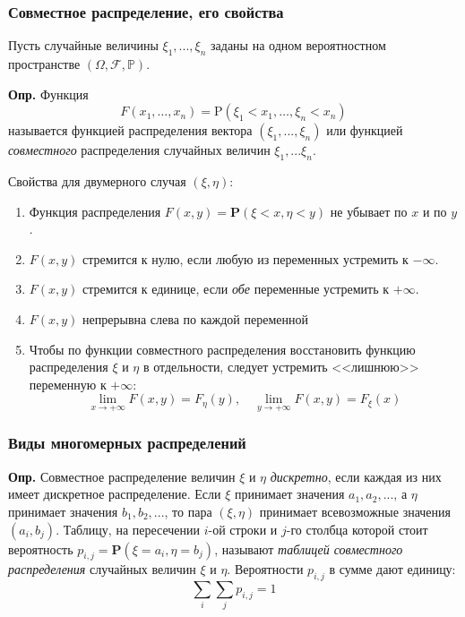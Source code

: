 \documentclass[oneside,final,14pt]{extreport}
\newcommand\mydef{{\bf Опр.}}
\newcommand\myprob[1]{{\mathbf{P}(#1)}}
\theoremstyle{definition}
\begin{document}
\subsubsection{Совместное распределение, его свойства}

Пусть случайные величины $\xi_1, ..., \xi_n$ заданы на одном вероятностном пространстве $(\Omega, \mathcal{F}, \mathbb{P})$.

\mydef{} Функция $$F\left(x_{1}, \ldots, x_{n}\right)=\mathrm{P}\left(\xi_{1}<x_{1}, \ldots, \xi_{n}<x_{n}\right)$$
называется функцией распределения вектора $(\xi_1, ..., \xi_n)$ или функцией {\it совместного} распределения случайных величин $\xi_1, ... \xi_n$.

Свойства для двумерного случая $(\xi, \eta)$:

\begin{enumerate}
    \item Функция распределения $F(x,y) = \myprob{\xi < x, \eta < y}$ не убывает по $x$ и по $y$.
    \item $F(x,y)$ стремится к нулю, если любую из переменных устремить к $-\infty$.
    \item $F(x,y)$ стремится к единице, если {\it обе} переменные устремить к $+\infty$.
    \item $F(x,y)$ непрерывна слева по каждой переменной
    \item Чтобы по функции совместного распределения восстановить функцию распределения $\xi$ и $\eta$ в отдельности, следует устремить <<лишнюю>> переменную к $+\infty$:
    $$\lim _{x \rightarrow+\infty} F(x, y)=F_{\eta}(y), \quad \lim _{y \rightarrow+\infty} F(x, y)=F_{\xi}(x)$$
\end{enumerate}

\subsubsection{Виды многомерных распределений}

\mydef{} Совместное распределение величин $\xi$ и $\eta$ {\it дискретно}, если каждая из них имеет дискретное распределение. Если $\xi$ принимает значения $a_1, a_2, ...$, а $\eta$ принимает значения $b_1, b_2, ...$, то пара $(\xi, \eta)$ принимает всевозможные значения $(a_i, b_j)$. Таблицу, на пересечении $i$-ой строки и $j$-го столбца которой стоит вероятность $p_{i,j} = \myprob{\xi = a_i, \eta = b_j}$, называют {\it таблицей совместного распределения} случайных величин $\xi$ и $\eta$. Вероятности $p_{i,j}$ в сумме дают единицу:
$$\sum_{i} \sum_{j} p_{i, j}=1$$
\end{document}
